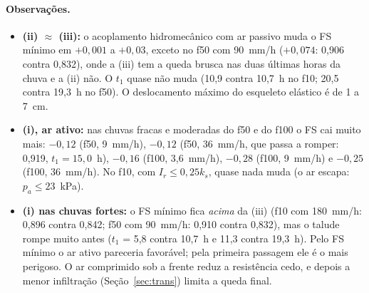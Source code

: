 \paragraph{Observações.}
\begin{itemize}
  \item \textbf{(ii) $\approx$ (iii):} o acoplamento hidromecânico com ar passivo muda o FS mínimo em $+0{,}001$ a
    $+0{,}03$, exceto no f50 com 90~mm/h ($+0{,}074$: 0,906 contra 0,832), onde a (iii) tem a queda brusca nas duas
    últimas horas da chuva e a (ii) não. O $t_1$ quase não muda (10,9 contra 10,7~h no f10; 20,5 contra 19,3~h no f50).
    O deslocamento máximo do esqueleto elástico é de 1 a 7~cm.
  \item \textbf{(i), ar ativo:} nas chuvas fracas e moderadas do f50 e do f100 o FS cai muito mais: $-0{,}12$ (f50,
    9~mm/h), $-0{,}12$ (f50, 36~mm/h, que passa a romper: 0,919, $t_1 = 15{,}0$~h), $-0{,}16$ (f100, 3,6~mm/h),
    $-0{,}28$ (f100, 9~mm/h) e $-0{,}25$ (f100, 36~mm/h). No f10, com $I_r \le 0{,}25k_s$, quase nada muda (o ar
    escapa: $p_a \le 23$~kPa).
  \item \textbf{(i) nas chuvas fortes:} o FS mínimo fica \emph{acima} da (iii) (f10 com 180~mm/h: 0,896 contra 0,842;
    f50 com 90~mm/h: 0,910 contra 0,832), mas o talude rompe muito antes ($t_1$ = 5,8 contra 10,7~h e 11,3 contra
    19,3~h). Pelo FS mínimo o ar ativo pareceria favorável; pela primeira passagem ele é o mais perigoso. O ar
    comprimido sob a frente reduz a resistência cedo, e depois a menor infiltração (Seção~\ref{sec:trans}) limita a
    queda final.
\end{itemize}
